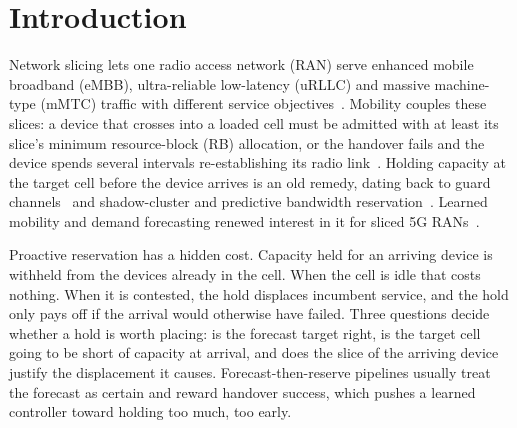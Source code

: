 \documentclass[journal]{IEEEtran}
\begin{document}
\section{Introduction}
Network slicing lets one radio access network (RAN) serve enhanced mobile broadband (eMBB), ultra-reliable low-latency (uRLLC) and massive machine-type (mMTC) traffic with different service objectives~\cite{foukas2017slicing,afolabi2018slicing,3gpp28541}. Mobility couples these slices: a device that crosses into a loaded cell must be admitted with at least its slice's minimum resource-block (RB) allocation, or the handover fails and the device spends several intervals re-establishing its radio link~\cite{3gpp38300}. Holding capacity at the target cell before the device arrives is an old remedy, dating back to guard channels~\cite{hong1986guard} and shadow-cluster and predictive bandwidth reservation~\cite{levine1997shadow,choi1998predictive}. Learned mobility and demand forecasting renewed interest in it for sliced 5G RANs~\cite{wu2026prens,li2020mobility,bega2020deepcog,gharehgoli2023uncertainty}.

Proactive reservation has a hidden cost. Capacity held for an arriving device is withheld from the devices already in the cell. When the cell is idle that costs nothing. When it is contested, the hold displaces incumbent service, and the hold only pays off if the arrival would otherwise have failed. Three questions decide whether a hold is worth placing: is the forecast target right, is the target cell going to be short of capacity at arrival, and does the slice of the arriving device justify the displacement it causes. Forecast-then-reserve pipelines usually treat the forecast as certain and reward handover success, which pushes a learned controller toward holding too much, too early.
\end{document}
